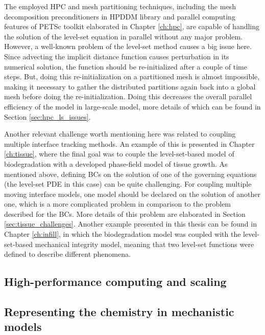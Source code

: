 The employed HPC and mesh partitioning techniques, including the mesh decomposition preconditioners in HPDDM library and parallel computing features of PETSc toolkit elaborated in Chapter \ref{ch:hpc}, are capable of handling the solution of the level-set equation in parallel without any major problem. However, a well-known problem of the level-set method causes a big issue here. Since advecting the implicit distance function causes perturbation in its numerical solution, the function should be re-initialized after a couple of time steps. But, doing this re-initialization on a partitioned mesh is almost impossible, making it necessary to gather the distributed partitions again back into a global mesh before doing the re-initialization. Doing this decreases the overall parallel efficiency of the model in large-scale model, more details of which can be found  in Section \ref{sec:hpc_ls_issues}.

Another relevant challenge worth mentioning here was related to coupling multiple interface tracking methods. An example of this is presented in Chapter \ref{ch:tissue}, where the final goal was to couple the level-set-based model of biodegradation with a developed phase-field model of tissue growth. As mentioned above, defining BCs on the solution of one of the governing equations (the level-set PDE in this case) can be quite challenging. For coupling multiple moving interface models, one model should be declared on the solution of another one, which is a more complicated problem in comparison to the problem described for the BCs. More details of this problem are elaborated in Section \ref{sec:tissue_challenges}. Another example presented in this thesis can be found in Chapter \ref{ch:infill}, in which the biodegradation model was coupled with the level-set-based mechanical integrity model, meaning that two level-set functions were defined to describe different phenomena.

\subsection{High-performance computing and scaling} \label{sec:conclusion_hpc}


\subsection{Representing the chemistry in mechanistic models}

